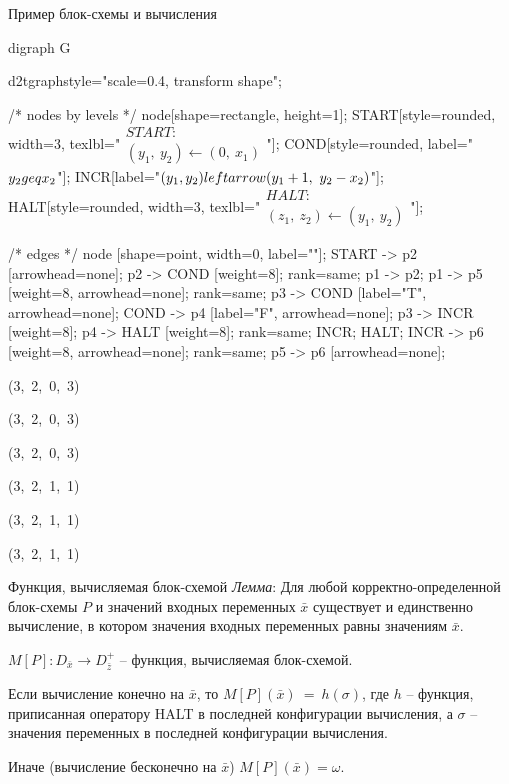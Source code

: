 \documentclass{beamer}
\begin{document}
	\begin{frame}[fragile]{Пример блок-схемы и вычисления}
	\setlength{\columnsep}{8cm}
	
	\begin{multicols}{2}
	
	\huge
	\begin{dot2tex}[options=-traw]
	digraph G{
		d2tgraphstyle="scale=0.4, transform shape";
		
		/* nodes by levels */
		node[shape=rectangle, height=1];
		START[style=rounded, width=3, texlbl="$\begin{matrix}START:\\ (y_1,~y_2) \leftarrow (0,~x_1)\end{matrix}$"];
		COND[style=rounded, label="$y_2 \\geq x_2$"];
		INCR[label="$(y_1, y_2) \\leftarrow (y_1 + 1,~y_2 - x_2)$"];
		HALT[style=rounded, width=3, texlbl="$\begin{matrix}HALT:\\  (z_1,~z_2) \leftarrow (y_1,~y_2)\end{matrix}$"];
				
		/* edges */
		node [shape=point, width=0, label=""];
		START -> p2 [arrowhead=none]; p2 -> COND [weight=8];
		{ rank=same; p1 -> p2; }
		p1 -> p5 [weight=8, arrowhead=none];
		{ rank=same; p3 -> COND [label="T", arrowhead=none]; COND -> p4 [label="F", arrowhead=none]; }
		p3 -> INCR [weight=8];
		p4 -> HALT [weight=8];
		{ rank=same; INCR; HALT; }
		INCR -> p6 [weight=8, arrowhead=none];
		{ rank=same; p5 -> p6 [arrowhead=none]; }
	}
	\end{dot2tex}
	
	\large
	
	(3,~2,~0,~3)
	
	(3,~2,~0,~3)
	
	(3,~2,~0,~3)
	
	(3,~2,~1,~1)
	
	(3,~2,~1,~1)
	
	(3,~2,~1,~1)
	
	
	\end{multicols}

	\end{frame}


	\begin{frame}{Функция, вычисляемая блок-схемой}
	\emph{Лемма}: Для любой корректно-определенной блок-схемы $P$ и значений входных переменных $\bar{x}$
	существует и единственно вычисление, в котором значения входных переменных равны значениям $\bar{x}$.

	$M[P] : D_{\bar{x}} \rightarrow D_{\bar{z}}^{+}$ -- функция, вычисляемая блок-схемой.

	Если вычисление конечно на $\bar{x}$, то $M[P](\bar{x})~=~h(\sigma)$, где $h$ -- функция, приписанная
	оператору HALT в последней конфигурации вычисления, а $\sigma$ -- значения переменных в последней конфигурации вычисления.

	Иначе (вычисление бесконечно на $\bar{x}$) $M[P](\bar{x}) = \omega$.
	\end{frame}
\end{document}
